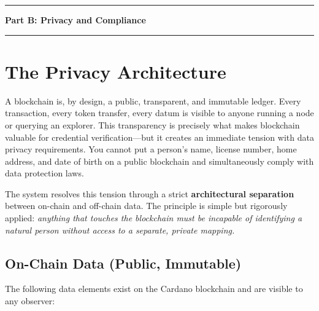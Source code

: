 
\vspace{0.5cm}
\noindent\rule{\textwidth}{1.2pt}
\begin{center}
  {\Large\sffamily\bfseries Part B: Privacy and Compliance}
\end{center}
\noindent\rule{\textwidth}{1.2pt}
\vspace{0.3cm}


\section{The Privacy Architecture}
\label{sec:privacy-architecture}

A blockchain is, by design, a public, transparent, and immutable ledger.
Every transaction, every token transfer, every datum is visible to anyone
running a node or querying an explorer.  This transparency is precisely
what makes blockchain valuable for credential verification---but it creates
an immediate tension with data privacy requirements.  You cannot put a
person's name, license number, home address, and date of birth on a public
blockchain and simultaneously comply with data protection laws.

The system resolves this tension through a strict \textbf{architectural
separation} between on-chain and off-chain data.  The principle is simple
but rigorously applied: \emph{anything that touches the blockchain must be
incapable of identifying a natural person without access to a separate,
private mapping.}

\subsection{On-Chain Data (Public, Immutable)}

The following data elements exist on the Cardano blockchain and are visible
to any observer:

